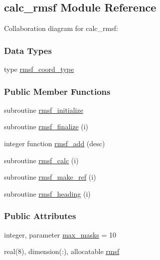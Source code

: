 \hypertarget{classcalc__rmsf}{\subsection{calc\-\_\-rmsf Module Reference}
\label{classcalc__rmsf}
}


Collaboration diagram for calc\-\_\-rmsf\-:
\subsubsection*{Data Types}
\begin{DoxyCompactItemize}
\item 
type \hyperlink{structcalc__rmsf_1_1rmsf__coord__type}{rmsf\-\_\-coord\-\_\-type}
\end{DoxyCompactItemize}
\subsubsection*{Public Member Functions}
\begin{DoxyCompactItemize}
\item 
subroutine \hyperlink{classcalc__rmsf_a9179b37a9a78d886358be738afc6cb67}{rmsf\-\_\-initialize}
\item 
subroutine \hyperlink{classcalc__rmsf_a7ea65c84cbb1c6f49010270f617d3340}{rmsf\-\_\-finalize} (i)
\item 
integer function \hyperlink{classcalc__rmsf_a4e6c49380436639f72a9ca5711477832}{rmsf\-\_\-add} (desc)
\item 
subroutine \hyperlink{classcalc__rmsf_aa06c01d8ab8a9c1e62fe92d36c9a6fc4}{rmsf\-\_\-calc} (i)
\item 
subroutine \hyperlink{classcalc__rmsf_acc914c615c8477f9d4ef1aefce32593b}{rmsf\-\_\-make\-\_\-ref} (i)
\item 
subroutine \hyperlink{classcalc__rmsf_a7bc4d2b20fc6597c1d4fb38d0bd1520c}{rmsf\-\_\-heading} (i)
\end{DoxyCompactItemize}
\subsubsection*{Public Attributes}
\begin{DoxyCompactItemize}
\item 
integer, parameter \hyperlink{classcalc__rmsf_a08de58a289bd52a0d7d467bb8d8d34e0}{max\-\_\-masks} = 10
\item 
real(8), dimension(\-:), allocatable \hyperlink{classcalc__rmsf_aee12c14d0b99212fcc8d411a3733e0e0}{rmsf}
\end{DoxyCompactItemize}
